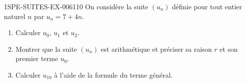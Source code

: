 \begin{exercice}{1SPE-SUITES-EX-006}{1}{10}
On considère la suite $(u_n)$ définie pour tout entier naturel $n$ par
$u_n = 7 + 4n$.
\begin{enumerate}
  \item Calculer $u_0$, $u_1$ et $u_2$.
  \item Montrer que la suite $(u_n)$ est arithmétique et préciser sa raison $r$ et son premier terme $u_0$.
  \item Calculer $u_{10}$ à l'aide de la formule du terme général.
\end{enumerate}
\end{exercice}

